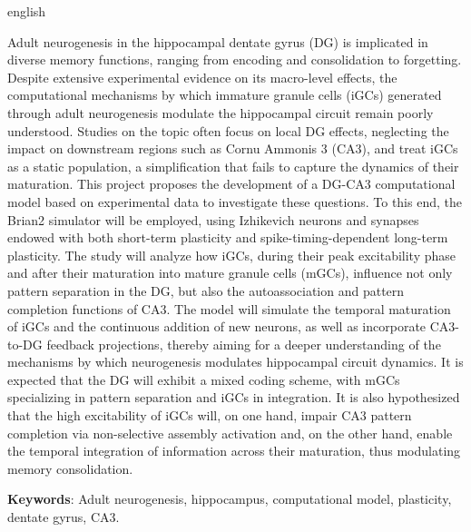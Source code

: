 \setlength{\absparsep}{18pt} %

\begin{resumo}[Abstract]
\begin{otherlanguage*}{english}

Adult neurogenesis in the hippocampal dentate gyrus (DG) is implicated in diverse memory functions, ranging from encoding and
consolidation to forgetting. Despite extensive experimental evidence on its macro-level effects, the computational mechanisms by
which immature granule cells (iGCs) generated through adult neurogenesis modulate the hippocampal circuit remain poorly
understood. Studies on the topic often focus on local DG effects, neglecting the impact on downstream regions such as Cornu
Ammonis 3 (CA3), and treat iGCs as a static population, a simplification that fails to capture the dynamics of their maturation.
This project proposes the development of a DG-CA3 computational model based on experimental data to investigate these questions.
To this end, the Brian2 simulator will be employed, using Izhikevich neurons and synapses endowed with both short-term plasticity
and spike-timing-dependent long-term plasticity. The study will analyze how iGCs, during their peak excitability phase and after
their maturation into mature granule cells (mGCs), influence not only pattern separation in the DG, but also the autoassociation
and pattern completion functions of CA3. The model will simulate the temporal maturation of iGCs and the continuous addition of
new neurons, as well as incorporate CA3-to-DG feedback projections, thereby aiming for a deeper understanding of the mechanisms by
which neurogenesis modulates hippocampal circuit dynamics. It is expected that the DG will exhibit a mixed coding scheme, with mGCs
specializing in pattern separation and iGCs in integration. It is also hypothesized that the high excitability of iGCs will, on
one hand, impair CA3 pattern completion via non-selective assembly activation and, on the other hand, enable the temporal
integration of information across their maturation, thus modulating memory consolidation.

\noindent \textbf{Keywords}: Adult neurogenesis, hippocampus, computational model, plasticity, dentate gyrus, CA3.
\end{otherlanguage*}
\end{resumo}

